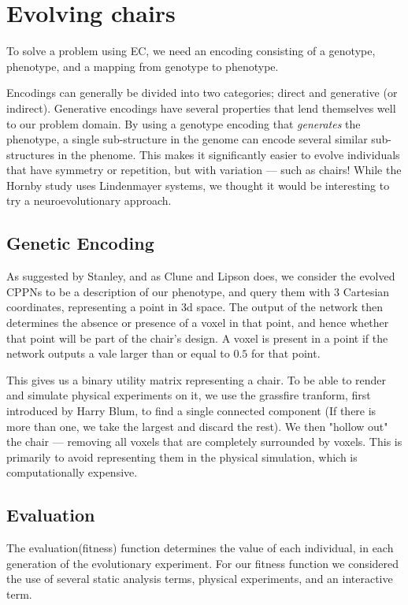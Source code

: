 \section{Evolving chairs}
To solve a problem using EC, we need an encoding consisting of a genotype,
phenotype, and a mapping from genotype to phenotype.

Encodings can generally be divided into two categories; direct and generative
(or indirect). Generative encodings have several properties that lend themselves
well to our problem domain. By using a genotype encoding that \emph{generates}
the phenotype, a single sub-structure in the genome can encode several similar
sub-structures in the phenome. This makes it significantly easier to evolve
individuals that have symmetry or repetition, but with variation --- such as
chairs! While the Hornby study\cite{paper:ev4} uses Lindenmayer
systems\cite{Hornby2003}, we thought it would be interesting to try a
neuroevolutionary approach.

\subsection{Genetic Encoding}
As suggested by Stanley\cite{Stanley2007}, and as Clune and
Lipson\cite{Clune:2011:EOG:2078245.2078246} does, we consider the evolved CPPNs
to be a description of our phenotype, and query them with 3 Cartesian
coordinates, representing a point in 3d space. The output of the network then
determines the absence or presence of a voxel in that point, and hence whether
that point will be part of the chair's design. A voxel is present in a point if
the network outputs a vale larger than or equal to $0.5$ for that point.

This gives us a binary utility matrix representing a chair. To be able to render
and simulate physical experiments on it, we use the grassfire tranform, first
introduced by Harry Blum\cite{blum67}, to find a single connected component (If
there is more than one, we take the largest and discard the rest). We then
"hollow out" the chair --- removing all voxels that are completely surrounded by
voxels. This is primarily to avoid representing them in the physical simulation,
which is computationally expensive.

\subsection{Evaluation}
\label{sec:evaluation}
The evaluation(fitness) function determines the value of each individual, in
each generation of the evolutionary experiment. For our fitness function we
considered the use of several static analysis terms, physical experiments, and
an interactive term.

